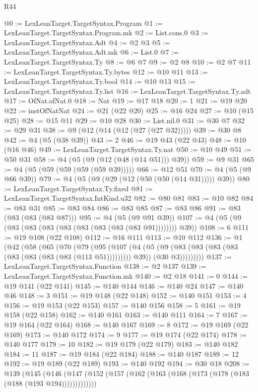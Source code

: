 \begin{lexlean}{R44}
\begin{coremodule}
@0 := LexLeanTarget.TargetSyntax.Program
@1 := LexLeanTarget.TargetSyntax.Program.mk
@2 := List.cons.{0}
@3 := LexLeanTarget.TargetSyntax.Adt
@4 := @2 @3
@5 := LexLeanTarget.TargetSyntax.Adt.mk
@6 := List.{0}
@7 := LexLeanTarget.TargetSyntax.Ty
@8 := @6 @7
@9 := @2 @8
@10 := @2 @7
@11 := LexLeanTarget.TargetSyntax.Ty.bytes
@12 := @10 @11
@13 := LexLeanTarget.TargetSyntax.Ty.bool
@14 := @10 @13
@15 := LexLeanTarget.TargetSyntax.Ty.list
@16 := LexLeanTarget.TargetSyntax.Ty.adt
@17 := OfNat.ofNat.{0}
@18 := Nat
@19 := @17 @18
@20 := 1
@21 := @19 @20
@22 := instOfNatNat
@24 := @21 (@22 @20)
@25 := @16 @24
@27 := @10 (@15 @25)
@28 := @15 @11
@29 := @10 @28
@30 := List.nil.{0}
@31 := @30 @7
@32 := @29 @31
@38 := @9 (@12 (@14 (@12 (@27 (@27 @32)))))
@39 := @30 @8
@42 := @4 (@5 (@38 @39))
@43 := 2
@46 := @19 @43 (@22 @43)
@48 := @10 (@16 @46)
@49 := LexLeanTarget.TargetSyntax.Ty.nat
@50 := @10 @49
@51 := @50 @31
@58 := @4 (@5 (@9 (@12 (@48 (@14 @51))) @39))
@59 := @9 @31
@65 := @4 (@5 (@59 (@59 (@59 (@59 @39)))))
@66 := @12 @51
@70 := @4 (@5 (@9 @66 @39))
@79 := @4 (@5 (@9 (@29 (@12 (@50 (@50 (@14 @31))))) @39))
@80 := LexLeanTarget.TargetSyntax.Ty.fixed
@81 := LexLeanTarget.TargetSyntax.IntKind.u32
@82 := @80 @81
@83 := @10 @82
@84 := @83 @31
@85 := @83 @84
@86 := @83 @85
@87 := @83 @86
@91 := @83 (@83 (@83 (@83 @87)))
@95 := @4 (@5 (@9 @91 @39))
@107 := @4 (@5 (@9 (@83 (@83 (@83 (@83 (@83 (@83 (@83 (@83 @91)))))))) @39))
@108 := 6
@111 := @19 @108 (@22 @108)
@112 := @16 @111
@113 := @10 @112
@136 := @1
    (@42
      (@58
        (@65
          (@70
            (@79
              (@95
                (@107
                  (@4
                    (@5 (@9 (@83 (@83 (@83 (@83 (@83 (@83 (@83 (@83 (@113 @51))))))))) @39))
                    (@30 @3)))))))))
@137 := LexLeanTarget.TargetSyntax.Function
@138 := @2 @137
@139 := LexLeanTarget.TargetSyntax.Function.mk
@140 := @2 @18
@141 := 0
@144 := @19 @141 (@22 @141)
@145 := @140 @144
@146 := @140 @24
@147 := @140 @46
@148 := 3
@151 := @19 @148 (@22 @148)
@152 := @140 @151
@153 := 4
@156 := @19 @153 (@22 @153)
@157 := @140 @156
@158 := 5
@161 := @19 @158 (@22 @158)
@162 := @140 @161
@163 := @140 @111
@164 := 7
@167 := @19 @164 (@22 @164)
@168 := @140 @167
@169 := 8
@172 := @19 @169 (@22 @169)
@173 := @140 @172
@174 := 9
@177 := @19 @174 (@22 @174)
@178 := @140 @177
@179 := 10
@182 := @19 @179 (@22 @179)
@183 := @140 @182
@184 := 11
@187 := @19 @184 (@22 @184)
@188 := @140 @187
@189 := 12
@192 := @19 @189 (@22 @189)
@193 := @140 @192
@194 := @30 @18
@208 := @139
    (@145 (@146 (@147 (@152 (@157 (@162 (@163 (@168 (@173 (@178 (@183 (@188 (@193 @194)))))))))))))

\end{coremodule}
\end{lexlean}
